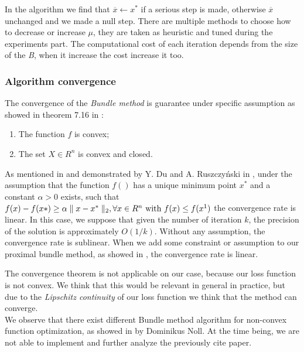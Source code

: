 In the algorithm we find that $\overline{x} \leftarrow x^*$ if a serious step is made, otherwise $\overline{x}$ unchanged and we made a null step.
There are multiple methods to choose how to decrease or increase $\mu$, they are taken as heuristic and tuned during the experiments part. The computational cost of each iteration depends from the size of the \textit{B}, when it increase the cost increase it too.

\subsubsection{Algorithm convergence}
The convergence of the \textit{Bundle method} is guarantee under specific assumption as showed in theorem 7.16 in \cite{NonOpt}:
\begin{enumerate} \label{convergence:assBM}
	\item The function $f$ is convex;
	\item The set $X \in R^n$ is convex and closed.
\end{enumerate}

As mentioned in \cite{PaperBM} and demonstrated by Y. Du and A. Ruszczyński in \cite{CBM}, under the assumption that the function $f()$ has a unique minimum point $x^*$ and a constant $\alpha>0$ exists, such that $f(x)-f(x*)\geq \alpha \parallel x-x^*\parallel_{2},\forall x \in R^n \textnormal{ with } f(x)\leq f(x^1)$ the convergence rate is linear. In this case, we suppose that given the number of iteration $k$, the precision of the solution is approximately $O(1/k)$. Without any assumption, the convergence rate is sublinear. When we add some constraint or assumption to our proximal bundle method, as showed in \cite{PBM}, the convergence rate is linear.

The convergence theorem is not applicable on our case, because our loss function is not convex. We think that this would be relevant in general in practice, but due to the \textit{ Lipschitz continuity} of our loss function we think that the method can converge.\\
We observe that there exist different Bundle method algorithm for non-convex function optimization, as showed in \cite{NCBM} by Dominikus Noll. At the time being, we are not able to implement and further analyze the previously cite paper. 

